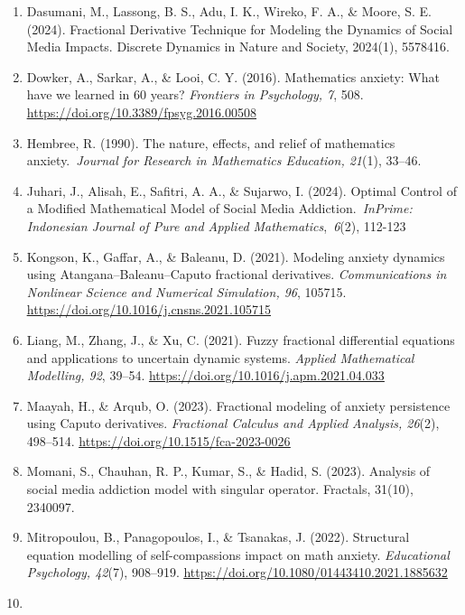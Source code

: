 \begin{enumerate}
\item
  Dasumani, M., Lassong, B. S., Adu, I. K., Wireko, F. A., \& Moore, S. E. (2024). Fractional Derivative Technique for Modeling the Dynamics of Social Media Impacts. Discrete Dynamics in Nature and Society, 2024(1), 5578416.
\item
  Dowker, A., Sarkar, A., \& Looi, C. Y. (2016). Mathematics anxiety: What have we learned in 60 years? \emph{Frontiers in Psychology, 7}, 508. \href{https://doi.org/10.3389/fpsyg.2016.00508}{\ul{https://doi.org/10.3389/fpsyg.2016.00508}}
\item
  Hembree, R. (1990). The nature, effects, and relief of mathematics anxiety.~\emph{Journal for Research in Mathematics Education, 21}(1), 33--46.
\item
  Juhari, J., Alisah, E., Safitri, A. A., \& Sujarwo, I. (2024). Optimal Control of a Modified Mathematical Model of Social Media Addiction.~\emph{InPrime: Indonesian Journal of Pure and Applied Mathematics},~\emph{6}(2), 112-123
\item
  Kongson, K., Gaffar, A., \& Baleanu, D. (2021). Modeling anxiety dynamics using Atangana--Baleanu--Caputo fractional derivatives. \emph{Communications in Nonlinear Science and Numerical Simulation, 96}, 105715. \href{https://doi.org/10.1016/j.cnsns.2021.105715}{\ul{https://doi.org/10.1016/j.cnsns.2021.105715}}
\item
  Liang, M., Zhang, J., \& Xu, C. (2021). Fuzzy fractional differential equations and applications to uncertain dynamic systems. \emph{Applied Mathematical Modelling, 92}, 39--54. \href{https://doi.org/10.1016/j.apm.2021.04.033}{\ul{https://doi.org/10.1016/j.apm.2021.04.033}}
\item
  Maayah, H., \& Arqub, O. (2023). Fractional modeling of anxiety persistence using Caputo derivatives. \emph{Fractional Calculus and Applied Analysis, 26}(2), 498--514. \href{https://doi.org/10.1515/fca-2023-0026}{\ul{https://doi.org/10.1515/fca-2023-0026}}
\item
  Momani, S., Chauhan, R. P., Kumar, S., \& Hadid, S. (2023). Analysis of social media addiction model with singular operator. Fractals, 31(10), 2340097.
\item
  Mitropoulou, B., Panagopoulos, I., \& Tsanakas, J. (2022). Structural equation modelling of self-compassion\textquotesingle s impact on math anxiety. \emph{Educational Psychology, 42}(7), 908--919. \href{https://doi.org/10.1080/01443410.2021.1885632}{\ul{https://doi.org/10.1080/01443410.2021.1885632}}
\item

\end{enumerate}
